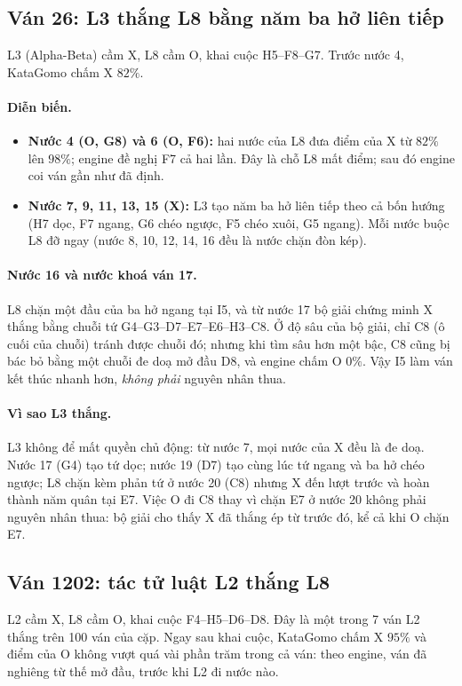 \subsection{Ván 26: L3 thắng L8 bằng năm ba hở liên tiếp}
\label{sec:cs-vs-26}
L3 (Alpha-Beta) cầm X, L8 cầm O, khai cuộc H5--F8--G7. Trước nước 4, KataGomo chấm X $82\%$.

\paragraph{Diễn biến.}
\begin{itemize}
  \item \textbf{Nước 4 (O, G8) và 6 (O, F6):} hai nước của L8 đưa điểm của X từ $82\%$ lên $98\%$; engine đề nghị F7 cả hai
  lần. Đây là chỗ L8 mất điểm; sau đó engine coi ván gần như đã định.
  \item \textbf{Nước 7, 9, 11, 13, 15 (X):} L3 tạo năm ba hở liên tiếp theo cả bốn hướng (H7 dọc, F7 ngang, G6 chéo ngược,
  F5 chéo xuôi, G5 ngang). Mỗi nước buộc L8 đỡ ngay (nước 8, 10, 12, 14, 16 đều là nước chặn đòn kép).
\end{itemize}
\paragraph{Nước 16 và nước khoá ván 17.} L8 chặn một đầu của ba hở ngang tại I5, và từ nước 17 bộ giải chứng minh X thắng
bằng chuỗi tứ G4--G3--D7--E7--E6--H3--C8. Ở độ sâu của bộ giải, chỉ C8 (ô cuối của chuỗi) tránh được chuỗi đó; nhưng khi
tìm sâu hơn một bậc, C8 cũng bị bác bỏ bằng một chuỗi đe doạ mở đầu D8, và engine chấm O $0\%$. Vậy I5 làm ván kết thúc
nhanh hơn, \emph{không phải} nguyên nhân thua.

\paragraph{Vì sao L3 thắng.} L3 không để mất quyền chủ động: từ nước 7, mọi nước của X đều là đe doạ. Nước 17 (G4) tạo tứ
dọc; nước 19 (D7) tạo cùng lúc tứ ngang và ba hở chéo ngược; L8 chặn kèm phản tứ ở nước 20 (C8) nhưng X đến lượt trước
và hoàn thành năm quân tại E7. Việc O đi C8 thay vì chặn E7 ở nước 20 không phải nguyên nhân thua: bộ giải cho thấy
X đã thắng ép từ trước đó, kể cả khi O chặn E7.


\subsection{Ván 1202: tác tử luật L2 thắng L8}
\label{sec:cs-vs-1202}
L2 cầm X, L8 cầm O, khai cuộc F4--H5--D6--D8. Đây là một trong 7 ván L2 thắng trên 100 ván của cặp. Ngay sau khai cuộc,
KataGomo chấm X $95\%$ và điểm của O không vượt quá vài phần trăm trong cả ván: theo engine, ván đã nghiêng từ thế mở đầu,
trước khi L2 đi nước nào.

